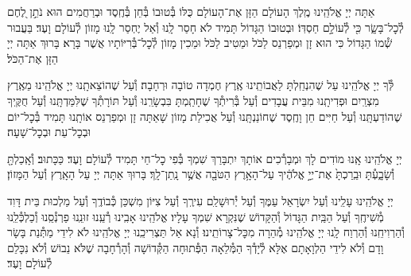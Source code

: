 \documentclass[twoside, openany, parskip=half, 11pt]{book}
\begin{document}
\nextpage
{}
אַתָּה יְיָ אֱלֹהֵֽינוּ מֶֽלֶךְ הָעוֹלָם הַזָּן אֶת־הָעוֹלָם כֻּלּוֹ בְּ֯טוּבוֹ בְּ֯חֵן בְּ֯חֶֽסֶד וּבְרַחֲמִים הוּא נֹתֵ֣ן לֶ֭חֶם לְ֯כׇל־בָּשָׂ֑ר כִּ֖י לְ֯עוֹלָ֣ם חַסְדּֽוֹ׃ וּבְטוּבוֹ הַגָּדוֹל תָּמִיד לֹא חָסַר לָֽנוּ וְ֯אַל יֶחְסַר לָֽנוּ מָזוֹן לְ֯עוֹלָם וָעֶד׃ בַּעֲבוּר שְׁ֯מוֹ הַגָּדוֹל כִּי הוּא זָן וּמְפַרְנֵס לַכֹּל וּמֵטִיב לַכֹּל וּמֵכִין מָזוֹן לְ֯כׇל־בְּ֯רִיּוֹתָיו אֲשֶׁר בָּרָא׃ בָּרוּךְ אַתָּה יְיָ הַזָּן אֶת־הַכֹּל׃



לְּ֯ךָ יְיָ אֱלֹהֵֽינוּ עַל שֶׁהִנְחַֽלְתָּ לַאֲבוֹתֵֽינוּ אֶֽרֶץ חֶמְדָה טוֹבָה וּרְחָבָה׃ וְ֯עַל שֶׁהוֹצֵאתָֽנוּ יְיָ אֱלֹהֵֽינוּ מֵאֶֽרֶץ מִצְרַֽיִם וּפְדִיתָֽנוּ מִבֵּית עֲבָדִים וְ֯עַל בְּ֯רִיתְ֯ךָ שֶׁחָתַֽמְתָּ בִּבְשָׂרֵֽנוּ וְ֯עַל תּוֹרָתְ֯ךָ שֶׁלִּמַּדְתָּֽנוּ וְ֯עַל חֻקֶּֽיךָ שֶׁהוֹדַעְתָּֽנוּ וְ֯עַל חַיִּים חֵן וָחֶֽסֶד שֶׁחוֹנַנְתָּֽנוּ וְ֯עַל אֲכִילַת מָזוֹן שָׁאַתָּה זָן וּמְפַרְנֵס אוֹתָֽנוּ תָּמִיד בְּ֯כׇל־יוֹם וּבְכׇל־עֵת וּבְכׇל־שָׁעָה׃


\alhanisim

יְיָ אֱלֹהֵֽינוּ אָֽנוּ מוֹדִים לָךְ וּמְבָרְ֯כִים אוֹתָךְ יִתְבָּרַךְ שִׁמְךָ בְּ֯פִי כׇל־חַי תָּמִיד לְ֯עוֹלָם וָעֶד׃ כַּכָּתוּב׃ וְ֯אָֽכַלְתָּ֖ וְ֯שָׂבָ֑עְ֯תָּ וּבֵֽרַכְתָּ֙ אֶת־יְיָ֣ אֱלֹהֶ֔יךָ עַל־הָאָ֥רֶץ הַטֹּבָ֖ה אֲשֶׁ֥ר נָֽתַן־לָֽךְ׃ בָּרוּךְ אַתָּה יְיָ עַל הָאָֽרֶץ וְ֯עַל הַמָּזוֹן׃



יְיָ אֱלֹהֵֽינוּ עָלֵֽינוּ וְ֯עַל יִשְׂרָאֵל עַמֶּךָ וְ֯עַל יְ֯רוּשָׁלַ‍ִם עִירֶֽךָ וְ֯עַל צִיּוֹן מִשְׁכַּן כְּ֯בוֹדֶֽךָ וְ֯עַל מַלְכוּת בֵּית דָּוִד מְ֯שִׁיחֶֽךָ וְ֯עַל הַבַּֽיִת הַגָּדוֹל וְ֯הַקָּדוֹשׁ שֶׁנִּקְרָא שִׁמְךָ עָלָיו׃ אֱלֹהֵֽינוּ אָבִֽינוּ רְ֯עֵֽנוּ זוּנֵֽנוּ פַרְנְ֯סֵֽנוּ וְ֯כַלְכְּ֯לֵֽנוּ וְ֯הַרְוִיחֵֽנוּ וְ֯הַרְוַח לָֽנוּ יְיָ אֱלֹהֵֽינוּ מְ֯הֵרָה מִכׇּל־צָרוֹתֵֽינוּ׃ וְ֯נָא אַל תַּצְרִיכֵֽנוּ יְיָ אֱלֹהֵֽינוּ לֹא לִידֵי מַתְּ֯נַת בָּשָׂר וָדָם וְ֯לֹא לִידֵי הַלְוָאָתָם אֶלָּא לְ֯יָדְ֯ךָ הַמְּ֯לֵאָה הַפְּ֯תוּחָה הַקְּ֯דוֹשָׁה וְ֯הָרְ֯חָבָה שֶׁלֹּא נֵבוֹשׁ וְ֯לֹא נִכָּלֵם לְ֯עוֹלָם וָעֶד׃

\enlargethispage{\baselineskip}
\end{document}
